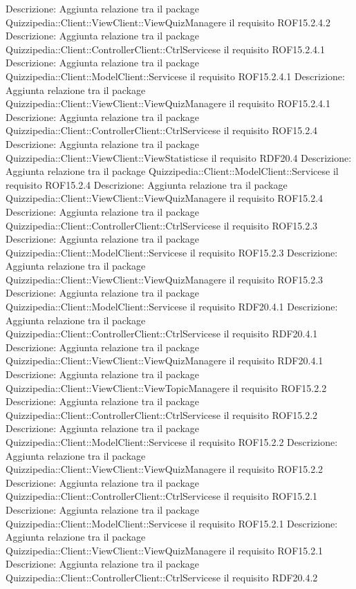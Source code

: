 Descrizione: Aggiunta relazione tra il package Quizzipedia::Client::ViewClient::ViewQuizManagere il requisito ROF15.2.4.2 
Descrizione: Aggiunta relazione tra il package Quizzipedia::Client::ControllerClient::CtrlServicese il requisito ROF15.2.4.1 
Descrizione: Aggiunta relazione tra il package Quizzipedia::Client::ModelClient::Servicese il requisito ROF15.2.4.1 
Descrizione: Aggiunta relazione tra il package Quizzipedia::Client::ViewClient::ViewQuizManagere il requisito ROF15.2.4.1 
Descrizione: Aggiunta relazione tra il package Quizzipedia::Client::ControllerClient::CtrlServicese il requisito ROF15.2.4 
Descrizione: Aggiunta relazione tra il package Quizzipedia::Client::ViewClient::ViewStatisticse il requisito RDF20.4 
Descrizione: Aggiunta relazione tra il package Quizzipedia::Client::ModelClient::Servicese il requisito ROF15.2.4 
Descrizione: Aggiunta relazione tra il package Quizzipedia::Client::ViewClient::ViewQuizManagere il requisito ROF15.2.4 
Descrizione: Aggiunta relazione tra il package Quizzipedia::Client::ControllerClient::CtrlServicese il requisito ROF15.2.3 
Descrizione: Aggiunta relazione tra il package Quizzipedia::Client::ModelClient::Servicese il requisito ROF15.2.3 
Descrizione: Aggiunta relazione tra il package Quizzipedia::Client::ViewClient::ViewQuizManagere il requisito ROF15.2.3 
Descrizione: Aggiunta relazione tra il package Quizzipedia::Client::ModelClient::Servicese il requisito RDF20.4.1 
Descrizione: Aggiunta relazione tra il package Quizzipedia::Client::ControllerClient::CtrlServicese il requisito RDF20.4.1 
Descrizione: Aggiunta relazione tra il package Quizzipedia::Client::ViewClient::ViewQuizManagere il requisito RDF20.4.1 
Descrizione: Aggiunta relazione tra il package Quizzipedia::Client::ViewClient::ViewTopicManagere il requisito ROF15.2.2 
Descrizione: Aggiunta relazione tra il package Quizzipedia::Client::ControllerClient::CtrlServicese il requisito ROF15.2.2 
Descrizione: Aggiunta relazione tra il package Quizzipedia::Client::ModelClient::Servicese il requisito ROF15.2.2 
Descrizione: Aggiunta relazione tra il package Quizzipedia::Client::ViewClient::ViewQuizManagere il requisito ROF15.2.2 
Descrizione: Aggiunta relazione tra il package Quizzipedia::Client::ControllerClient::CtrlServicese il requisito ROF15.2.1 
Descrizione: Aggiunta relazione tra il package Quizzipedia::Client::ModelClient::Servicese il requisito ROF15.2.1 
Descrizione: Aggiunta relazione tra il package Quizzipedia::Client::ViewClient::ViewQuizManagere il requisito ROF15.2.1 
Descrizione: Aggiunta relazione tra il package Quizzipedia::Client::ControllerClient::CtrlServicese il requisito RDF20.4.2 
